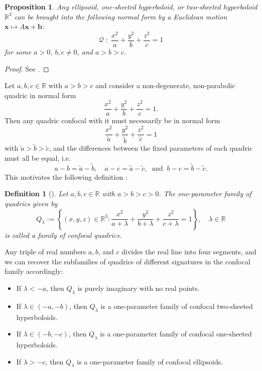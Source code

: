 \documentclass[10pt, a4paper]{article}
\theoremstyle{BoldTopSpacing}
\theoremstyle{BoldTopSpacing}
\theoremstyle{BoldTopSpacing}
\theoremstyle{BoldTopBottomSpacing}
\newtheorem{definition}{Definition}[section]
\theoremstyle{BoldTopSpacing}
\newtheorem{proposition}{Proposition}[section]
\theoremstyle{BoldTopBottomSpacing}
\theoremstyle{remark}
\begin{document}
\begin{proposition}
\label{prop:normal-form}
Any ellipsoid, one-sheeted hyperboloid, or two-sheeted hyperboloid $\mathbb{R}^3$ can be brought into the following normal form by a Euclidean motion $\boldsymbol{x} \mapsto A \boldsymbol{x} + \boldsymbol{b}$:
\[
    \mathcal{Q} \; : \; \frac{x^2}{a} + \frac{y^2}{b} + \frac{z^2}{c} = 1
\]
for some $a > 0$, $b, c \neq 0$, and $a > b > c$.
\end{proposition}

\begin{proof}
    See \cite[\textcolor{CitationColor}{Ch.~3}]{odehnalUniverseQuadrics2020}.
\end{proof}

Let $a, b, c \in \mathbb{R}$ with $a > b > c$ and consider a non-degenerate, non-parabolic quadric in normal form
\[
    \frac{x^2}{a} + \frac{y^2}{b} + \frac{z^2}{c} = 1.
\]
Then any quadric confocal with it must necessarily be in normal form
\[
    \frac{x^2}{\tilde{a}} + \frac{y^2}{\tilde{b}} + \frac{z^2}{\tilde{c}} = 1
\]
with $\tilde{a} > \tilde{b} > \tilde{c}$, and the differences between the fixed parameters of each quadric must all be equal, i.e.
\[
    a - b = \tilde{a} - \tilde{b}, \quad a - c = \tilde{a} - \tilde{c}, \ \text{ and } \  b - c = \tilde{b} - \tilde{c}.
\]
This motivates the following definition \cite{geometryIII}:

\begin{definition}[]
\label{def:family-of-confocal-quadrics}
Let $a, b, c \in \mathbb{R}$ with $a > b > c > 0$. The one-parameter family of quadrics given by
\[
    Q_{\lambda} := \left\{ (x, y, z) \in \mathbb{R}^3 : \frac{x^2}{a + \lambda} + \frac{y^2}{b + \lambda} + \frac{z^2}{c + \lambda} = 1 \right\}, \quad \lambda \in \mathbb{R}
\]
is called a family of \textit{confocal quadrics}.
\end{definition}

Any triple of real numbers $a, b$, and $c$ divides the real line into four segments, and we can recover the subfamilies of quadrics of different signatures in the confocal family accordingly:

\begin{itemize}[label=$\blacktriangleright$]
    \item If $\lambda < -a$, then $Q_{\lambda}$ is purely imaginary with no real points.
    \item If $\lambda \in (-a, -b)$, then $Q_{\lambda}$ is a one-parameter family of confocal two-sheeted hyperboloids.
    \item If $\lambda \in (-b, -c)$, then $Q_{\lambda}$ is a one-parameter family of confocal one-sheeted hyperboloids.
    \item If $\lambda > -c$, then $Q_{\lambda}$ is a one-parameter family of confocal ellipsoids. \par
\end{itemize}
\end{document}
